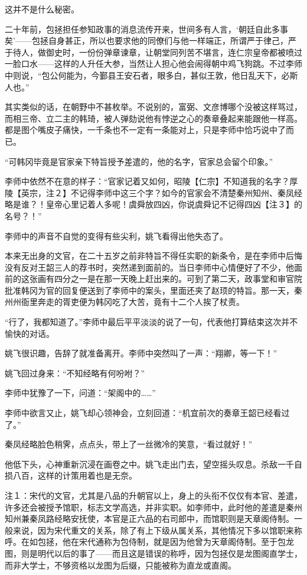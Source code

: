 这并不是什么秘密。

二十年前，包拯担任参知政事的消息流传开来，世间多有人言，‘朝廷自此多事矣’——包拯自身甚正，所以也要求他的同僚们与他一样端正，所谓严于律己，严于待人，做御史时，一份份弹章谏章，让朝堂同列苦不堪言，连仁宗皇帝都被喷过一脸口水——这样的人升任大参，当然让人担心他会闹得朝中鸡飞狗跳。不过李师中则说，“包公何能为，今鄞县王安石者，眼多白，甚似王敦，他日乱天下，必斯人也。”

其实类似的话，在朝野中不甚枚举。不说别的，富弼、文彦博哪个没被这样骂过，而相三帝、立二主的韩琦，被人弹劾说他有悖逆之心的奏章叠起来能跟他一样高。都是图个嘴皮子痛快，一千条也不一定有一条能对上，只是李师中恰巧说中了而已。

“可韩冈毕竟是官家亲下特旨授予差遣的，他的名字，官家总会留个印象。”

李师中依然不在意的样子：“官家记着又如何，昭陵【仁宗】不知道我的名字？厚陵【英宗，注２】不记得李师中这三个字？如今的官家会不清楚秦州知州、秦凤经略是谁？！皇帝心里记着人多呢！虞舜放四凶，你说虞舜记不记得四凶【注３】的名号？！”

李师中的声音不自觉的变得有些尖利，姚飞看得出他失态了。

本来无出身的文官，在二十五岁之前非特旨不得任实职的新条令，是在李师中后悔没有反对王韶三人的荐书时，突然递到面前的。当日李师中心情便好了不少，他面前的这张画有四分之一是在那一天晚上赶出来的。可到了第二天，政事堂和审官院批准韩冈为官的回复便送到了李师中的案头，里面还夹了赵顼的特旨。那一天，秦州州衙里奔走的胥吏便为韩冈吃了大苦，竟有十二个人挨了杖责。

“行了，我都知道了。”李师中最后平平淡淡的说了一句，代表他打算结束这次并不愉快的对话。

姚飞很识趣，告辞了就准备离开。李师中突然叫了一声：“翔卿，等一下！”

姚飞回过身来：“不知经略有何吩咐？”

李师中犹豫了一下，问道：“架阁中的……”

李师中欲言又止，姚飞却心领神会，立刻回道：“机宜前次的奏章王韶已经看过了。”

秦凤经略脸色稍霁，点点头，带上了一丝微冷的笑意，“看过就好！”

他低下头，心神重新沉浸在画卷之中。姚飞走出门去，望空摇头叹息。杀敌一千自损八百，这样的计策用着也是无奈。

注１：宋代的文官，尤其是八品的升朝官以上，身上的头衔不仅仅有本官、差遣，许多还会被授予馆职，标志文学高选，并非实职。如李师中，此时他的差遣是秦州知州兼秦凤路经略安抚使，本官是正六品的右司郎中，而馆职则是天章阁侍制。一般来说，因为宋代重文的关系，除了有上下级从属关系，其他情况下多以馆职来称呼。在如包拯，他在宋代通称为包侍制，就是因为他曾为天章阁侍制。至于包龙图，则是明代以后的事了——而且这是错误的称呼，因为包拯仅是龙图阁直学士，而非大学士，不够资格以龙图为后缀，只能被称为直龙或直阁。

